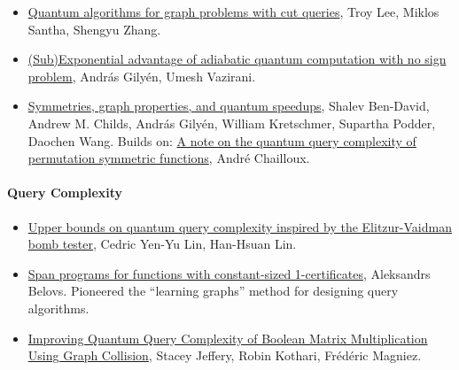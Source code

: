 \documentclass[12pt]{article}
\begin{document}
\begin{itemize}
  \item \href{https://arxiv.org/abs/2007.08285}{Quantum algorithms for graph problems with cut queries}, Troy Lee, Miklos Santha, Shengyu Zhang.
  \item \href{https://arxiv.org/abs/2011.09495}{(Sub)Exponential advantage of adiabatic quantum computation with no sign problem}, Andr\'{a}s Gily\'{e}n, Umesh Vazirani.
  \item \href{https://arxiv.org/abs/2006.12760}{Symmetries, graph properties, and quantum speedups}, Shalev Ben-David, Andrew M. Childs, Andr\'{a}s Gily\'{e}n, William Kretschmer, Supartha Podder, Daochen Wang.  Builds on: 
  \href{https://arxiv.org/abs/1810.01790}{A note on the quantum query complexity of permutation symmetric functions}, Andr\'{e} Chailloux.
\end{itemize}

\paragraph*{Query Complexity}
\begin{itemize}
  \item \href{https://arxiv.org/abs/1410.0932}{Upper bounds on quantum query complexity inspired by the Elitzur-Vaidman bomb tester}, Cedric Yen-Yu Lin, Han-Hsuan Lin.  
  \item \href{https://arxiv.org/abs/1105.4024}{Span programs for functions with constant-sized 1-certificates}, Aleksandrs Belovs.  Pioneered the ``learning graphs'' method 
  for designing query algorithms.
  \item \href{https://arxiv.org/abs/1112.5855}{Improving Quantum Query Complexity of Boolean Matrix Multiplication Using Graph Collision}, Stacey Jeffery, Robin Kothari, Fr\'{e}d\'{e}ric Magniez.
\end{itemize}
\end{document}
